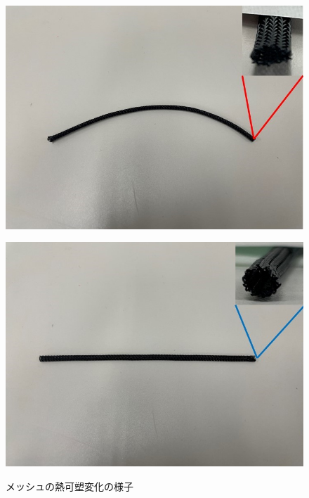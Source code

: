 \begin{figure}[ht]
  \begin{minipage}{0.5\hsize}
    \centering  
    \includegraphics[scale=0.25]{image/messhu_hikaku_1.jpg}
    \label{fig:messhu_1}
  \end{minipage}
  \begin{minipage}{0.5\hsize}
    \centering
    \includegraphics[scale=0.25]{image/messhu_hikaku_2.jpg}
    \label{fig:messhu_2}
  \end{minipage}
  \caption{メッシュの熱可塑変化の様子}
  \label{fig:messhu_henka}
\end{figure}
%
